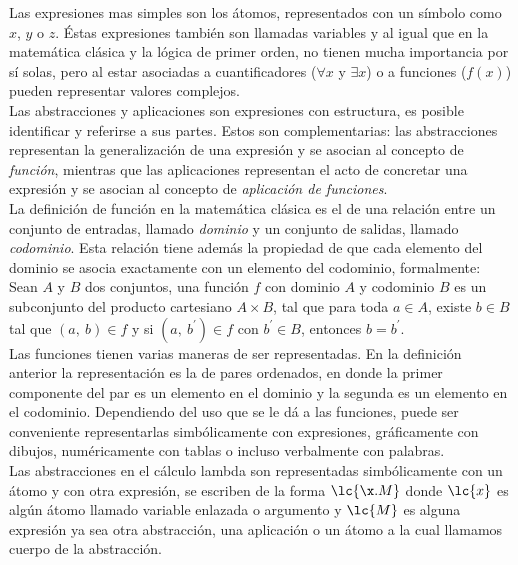 Las expresiones mas simples son los átomos, representados con un símbolo como
\(x\), \(y\) o \(z\). Éstas expresiones también son llamadas variables y al
igual que en la matemática clásica y la lógica de primer orden, no tienen mucha
importancia por sí solas, pero al estar asociadas a cuantificadores (\(\forall
x\) y \(\exists x\)) o a funciones (\(f(x)\)) pueden representar valores
complejos. \\

Las abstracciones y aplicaciones son expresiones con estructura, es posible
identificar y referirse a sus partes. Estos son complementarias: las
abstracciones representan la generalización de una expresión y se asocian al
concepto de \emph{función}, mientras que las aplicaciones representan el acto de
concretar una expresión y se asocian al concepto de \emph{aplicación de
  funciones}. \\

La definición de función en la matemática clásica es el de una relación entre un
conjunto de entradas, llamado \emph{dominio} y un conjunto de salidas, llamado
\emph{codominio}. Esta relación tiene además la propiedad de que cada elemento
del dominio se asocia exactamente con un elemento del codominio, formalmente: \\

Sean \(A\) y \(B\) dos conjuntos, una función \(f\) con dominio \(A\) y
codominio \(B\) es un subconjunto del producto cartesiano \(A\times B\), tal que
para toda \(a\in A\), existe \(b\in B\) tal que \((a,\ b)\in f\) y si \((a,\
b^\prime)\in f\) con \(b^\prime \in B\), entonces \(b=b^\prime\). \\

Las funciones tienen varias maneras de ser representadas. En la definición
anterior la representación es la de pares ordenados, en donde la primer
componente del par es un elemento en el dominio y la segunda es un elemento en
el codominio. Dependiendo del uso que se le dá a las funciones,
puede ser conveniente representarlas simbólicamente con expresiones,
gráficamente con dibujos, numéricamente con tablas o incluso verbalmente con
palabras. \\

Las abstracciones en el cálculo lambda son representadas simbólicamente con un
átomo y con otra expresión, se escriben de la forma \(\lc{\x.M}\) donde
\(\lc{x}\) es algún átomo llamado variable enlazada o argumento y \(\lc{M}\)
es alguna expresión ya sea otra abstracción, una aplicación o un átomo a la cual
llamamos cuerpo de la abstracción. \\

